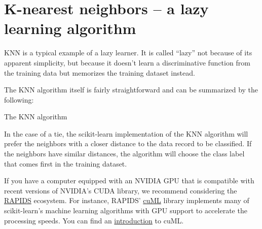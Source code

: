 \section{K-nearest neighbors – a lazy learning algorithm}
KNN is a typical example of a lazy learner. It is called “lazy” not because of its apparent simplicity, but because it doesn't learn a discriminative function from the training data but memorizes the training dataset instead.

The KNN algorithm itself is fairly straightforward and can be summarized by the following:
\begin{algorithm}
    \caption{The KNN algorithm}
\end{algorithm}

In the case of a tie, the scikit-learn implementation of the KNN algorithm will prefer the neighbors with a closer distance to the data record to be classified. If the neighbors have similar distances, the algorithm will choose the class label that comes first in the training dataset.


\begin{tcolorbox}[title=Alternative machine learning implementations with GPU support]
    If you have a computer equipped with an NVIDIA GPU that is compatible with recent versions of NVIDIA's CUDA library, we recommend considering the \href{https://docs.rapids.ai/api}{RAPIDS} ecosystem. For instance, RAPIDS' \href{https://docs.rapids.ai/api/cuml/stable/}{cuML} library implements many of scikit-learn's machine learning algorithms with GPU support to accelerate the processing speeds. You can find an \href{https://docs.rapids.ai/api/cuml/stable/estimator_intro.html}{introduction} to cuML.
\end{tcolorbox}
